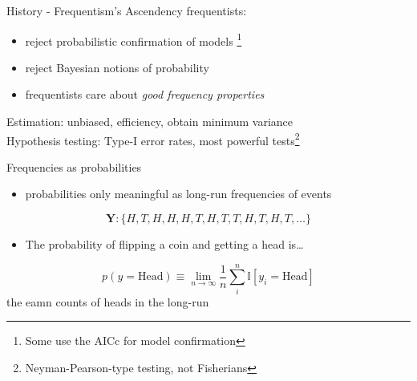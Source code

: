 \documentclass[presentation,9pt,xcolor=dvipsnames]{beamer}
\begin{document}
\begin{frame}[label={sec:org3095dbf}]{History - Frequentism's Ascendency}
frequentists:
\begin{itemize}
\item reject probabilistic confirmation of models \footnote{Some use the AICc for model confirmation}
\item reject Bayesian notions of probability
\item frequentists care about \emph{good frequency properties}
\end{itemize}
Estimation: unbiased, efficiency, obtain minimum variance\\
Hypothesis testing: Type-I error rates, most powerful tests\footnote{Neyman-Pearson-type testing, not Fisherians}
\begin{block}{Frequencies as probabilities}
\begin{itemize}
\item probabilities only meaningful as long-run frequencies of events
\end{itemize}
\begin{equation}\mathbf{Y}\colon\{H,T,H,H,H,T,H,T,T,H,T,H,T,\dots\}\end{equation}
\begin{itemize}
\item The probability of flipping a coin and getting a head is\ldots{}
\end{itemize}
\begin{equation}p(y=\text{Head})\equiv \lim_{n\rightarrow\infty}\frac{1}{n}\sum_i^n \mathbb{I}[y_i\!=\!\text{Head}] \end{equation}
the eamn counts of heads in the long-run
\end{block}
\end{frame}
\end{document}
